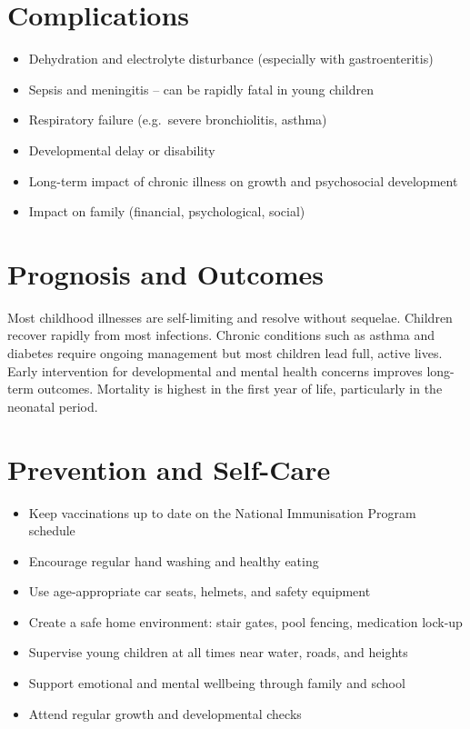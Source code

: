 \section*{Complications}
\begin{itemize}
    \item Dehydration and electrolyte disturbance (especially with gastroenteritis)
    \item Sepsis and meningitis -- can be rapidly fatal in young children
    \item Respiratory failure (e.g.\ severe bronchiolitis, asthma)
    \item Developmental delay or disability
    \item Long-term impact of chronic illness on growth and psychosocial development
    \item Impact on family (financial, psychological, social)
\end{itemize}

\section*{Prognosis and Outcomes}
Most childhood illnesses are self-limiting and resolve without sequelae. Children recover rapidly from most infections. Chronic conditions such as asthma and diabetes require ongoing management but most children lead full, active lives. Early intervention for developmental and mental health concerns improves long-term outcomes. Mortality is highest in the first year of life, particularly in the neonatal period.

\section*{Prevention and Self-Care}
\begin{itemize}
    \item Keep vaccinations up to date on the National Immunisation Program schedule
    \item Encourage regular hand washing and healthy eating
    \item Use age-appropriate car seats, helmets, and safety equipment
    \item Create a safe home environment: stair gates, pool fencing, medication lock-up
    \item Supervise young children at all times near water, roads, and heights
    \item Support emotional and mental wellbeing through family and school
    \item Attend regular growth and developmental checks
\end{itemize}

